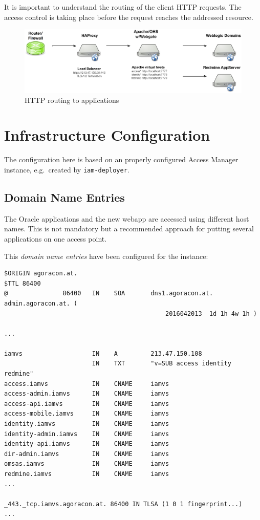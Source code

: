 \documentclass[11pt]{report}
\begin{document}
It is important to understand the routing of the client HTTP requests.  The
access control is taking place before the request reaches the addressed
resource.

\begin{figure}[H]
    \centering
    \includegraphics[width=1\textwidth]{diag/iamvs}
    \caption{HTTP routing to applications}
\end{figure}


\newpage

\section{Infrastructure Configuration}

The configuration here is based on an properly configured Access Manager
instance, e.g.\ created by \verb|iam-deployer|.


\subsection{Domain Name Entries}

The Oracle applications and the new webapp are accessed using different host
names.  This is not mandatory but a recommended approach for putting several
applications on one access point.

This \emph{domain name entries} have been configured for the instance:


\begin{Verbatim}[label=DNS Zone]
$ORIGIN agoracon.at.
$TTL 86400 
@               86400   IN    SOA       dns1.agoracon.at. admin.agoracon.at. ( 
                                            2016042013  1d 1h 4w 1h )

...

iamvs                   IN    A         213.47.150.108
                        IN    TXT       "v=SUB access identity redmine"
access.iamvs            IN    CNAME     iamvs
access-admin.iamvs      IN    CNAME     iamvs
access-api.iamvs        IN    CNAME     iamvs
access-mobile.iamvs     IN    CNAME     iamvs
identity.iamvs          IN    CNAME     iamvs
identity-admin.iamvs    IN    CNAME     iamvs
identity-api.iamvs      IN    CNAME     iamvs
dir-admin.iamvs         IN    CNAME     iamvs
omsas.iamvs             IN    CNAME     iamvs
redmine.iamvs           IN    CNAME     iamvs
...

_443._tcp.iamvs.agoracon.at. 86400 IN TLSA (1 0 1 fingerprint...)
...
\end{Verbatim}
\end{document}
